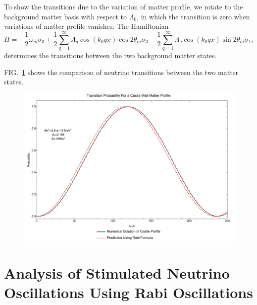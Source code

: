\documentclass[%
preprint,
 amsmath,amssymb,
 aps,
]{revtex4-1}
\begin{document}
To show the transitions due to the variation of matter profile, we rotate to the background matter basis with respect to $\Lambda_0$, in which the transition is zero when variations of matter profile vanishes. The Hamiltonian
\begin{equation}
H = - \frac{1}{2}\omega_m \sigma_3  + \frac{1}{2} \sum_{q=1}^{\infty} \Lambda_q \cos\left( k_0 q x \right) \cos 2\theta_m \sigma_3 - \frac{1}{2} \sum_{q=1}^{\infty} \Lambda_q \cos\left( k_0 q x \right) \sin 2\theta_m \sigma_1,
\end{equation}
determines the transitions between the two background matter states.


FIG.~\ref{fig-akhmedovOscPlt} shows the comparison of neutrino transitions between the two matter states.

\begin{figure}[!htbp]
                \centering
                \includegraphics[width=\textwidth]{assets/akhmedovOscPlt}
                \caption{}
                \label{fig-akhmedovOscPlt}
\end{figure}










\section{\label{stimulated}Analysis of Stimulated Neutrino Oscillations Using Rabi Oscillations}
\end{document}
